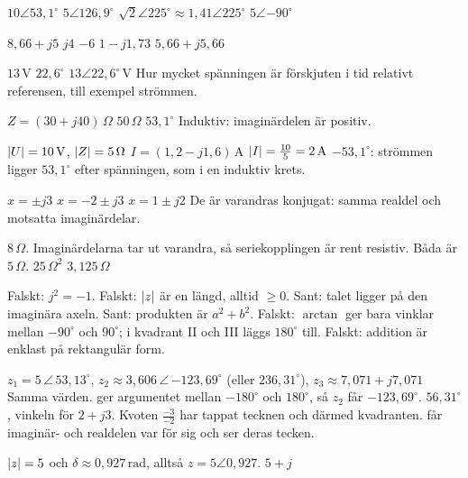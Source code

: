\begin{facit}
  $10\angle 53{,}1^{\circ}$  $5\angle 126{,}9^{\circ}$
 $\sqrt{2}\angle 225^{\circ} \approx 1{,}41\angle 225^{\circ}$  $5\angle{-90^{\circ}}$

  $8{,}66 + j5$  $j4$  $-6$  $1 - j1{,}73$
 $5{,}66 + j5{,}66$

  $13\,\text{V}$  $22{,}6^{\circ}$  $13\angle 22{,}6^{\circ}\,\text{V}$
 Hur mycket spänningen är förskjuten i tid relativt referensen, till exempel strömmen.

  $Z = (30 + j40)\,\Omega$  $50\,\Omega$  $53{,}1^{\circ}$
 Induktiv: imaginärdelen är positiv.

  $\lvert U\rvert = 10\,\text{V}$, $\lvert Z\rvert = 5\,\Omega$
 $I = (1{,}2 - j1{,}6)\,\text{A}$  $\lvert I\rvert = \frac{10}{5} = 2\,\text{A}$
 $-53{,}1^{\circ}$: strömmen ligger $53{,}1^{\circ}$ efter spänningen, som i en induktiv
krets.

  $x = \pm j3$  $x = -2 \pm j3$  $x = 1 \pm j2$
 De är varandras konjugat: samma realdel och motsatta imaginärdelar.

  $8\,\Omega$. Imaginärdelarna tar ut varandra, så seriekopplingen är rent
resistiv.  Båda är $5\,\Omega$.  $25\,\Omega^2$  $3{,}125\,\Omega$

  Falskt: $j^2 = -1$.
 Falskt: $\lvert z\rvert$ är en längd, alltid $\geq 0$.
 Sant: talet ligger på den imaginära axeln.
 Sant: produkten är $a^2 + b^2$.
 Falskt: $\arctan$ ger bara vinklar mellan $-90^{\circ}$ och $90^{\circ}$; i kvadrant II
och III läggs $180^{\circ}$ till.
 Falskt: addition är enklast på rektangulär form.

  $z_1 = 5\,\angle\,53{,}13^{\circ}$,
$z_2 \approx 3{,}606\,\angle\,{-123{,}69^{\circ}}$ (eller $236{,}31^{\circ}$),
$z_3 \approx 7{,}071 + j7{,}071$
 Samma värden.  ger argumentet mellan $-180^{\circ}$ och $180^{\circ}$, så $z_2$
får $-123{,}69^{\circ}$.
 $56{,}31^{\circ}$, vinkeln för $2 + j3$. Kvoten $\frac{-3}{-2}$ har tappat tecknen och därmed
kvadranten.  får imaginär- och realdelen var för sig och ser deras tecken.

  $\lvert z\rvert = 5$ och $\delta \approx 0{,}927\,\text{rad}$, alltså
$z = 5\angle 0{,}927$.  $5 + j$

\end{facit}
